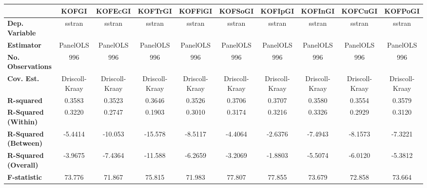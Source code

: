 \begin{center}
\begin{tabular}{lccccccccc}
\toprule
                                   &   \textbf{KOFGI}   &  \textbf{KOFEcGI}  &  \textbf{KOFTrGI}  &  \textbf{KOFFiGI}  &  \textbf{KOFSoGI}  &  \textbf{KOFIpGI}  &  \textbf{KOFInGI}  &  \textbf{KOFCuGI}  &  \textbf{KOFPoGI}   \\
\midrule
\textbf{Dep. Variable}             &       sstran       &       sstran       &       sstran       &       sstran       &       sstran       &       sstran       &       sstran       &       sstran       &       sstran        \\
\textbf{Estimator}                 &      PanelOLS      &      PanelOLS      &      PanelOLS      &      PanelOLS      &      PanelOLS      &      PanelOLS      &      PanelOLS      &      PanelOLS      &      PanelOLS       \\
\textbf{No. Observations}          &        996         &        996         &        996         &        996         &        996         &        996         &        996         &        996         &        996          \\
\textbf{Cov. Est.}                 &   Driscoll-Kraay   &   Driscoll-Kraay   &   Driscoll-Kraay   &   Driscoll-Kraay   &   Driscoll-Kraay   &   Driscoll-Kraay   &   Driscoll-Kraay   &   Driscoll-Kraay   &   Driscoll-Kraay    \\
\textbf{R-squared}                 &       0.3583       &       0.3523       &       0.3646       &       0.3526       &       0.3706       &       0.3707       &       0.3580       &       0.3554       &       0.3579        \\
\textbf{R-Squared (Within)}        &       0.3220       &       0.2747       &       0.1903       &       0.3010       &       0.3174       &       0.3216       &       0.3326       &       0.2929       &       0.3120        \\
\textbf{R-Squared (Between)}       &      -5.4414       &      -10.053       &      -15.578       &      -8.5117       &      -4.4064       &      -2.6376       &      -7.4943       &      -8.1573       &      -7.3221        \\
\textbf{R-Squared (Overall)}       &      -3.9675       &      -7.4364       &      -11.588       &      -6.2659       &      -3.2069       &      -1.8803       &      -5.5074       &      -6.0120       &      -5.3812        \\
\textbf{F-statistic}               &       73.776       &       71.867       &       75.815       &       71.983       &       77.807       &       77.855       &       73.679       &       72.858       &       73.664        \\

\end{tabular}
\end{center}
